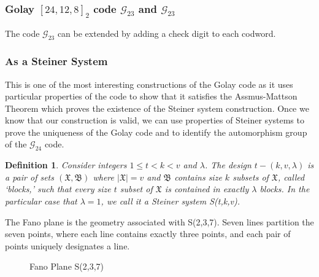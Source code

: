 \documentclass[paper=a4, fontsize=11pt]{scrartcl} %
\numberwithin{equation}{section} %
\numberwithin{figure}{section} %
\numberwithin{table}{section} %
\theoremstyle{break}
\newtheorem{defn}{Definition}
\begin{document}
\subsubsection{Golay $[24,12,8]_2$ code $\mathcal{G}_{23}$ and $\mathcal{G}_{23}$}
The code $\mathcal{G}_{23}$ can be extended by adding a check digit to each codword.

\subsubsection{As a Steiner System}
This is one of the most interesting constructions of the Golay code as it uses particular properties of the code to show that it satisfies the Assmus-Mattson Theorem which proves the existence of the Steiner system construction. Once we know that our construction is valid, we can use properties of Steiner systems to prove the uniqueness of the Golay code and to identify the automorphism group of the $\mathcal{G}_{24}$ code.

\begin{defn}
Consider integers $1 \leq t < k < v$ and $\lambda$. The design $t-(k,v,\lambda)$ is a pair of sets $(\mathfrak{X},\mathfrak{B})$ where $|\mathfrak{X}|=v$ and $\mathfrak{B}$ contains size $k$ subsets of $\mathfrak{X}$, called `blocks,' such that every size $t$ subset of $\mathfrak{X}$ is contained in exactly $\lambda$ blocks. In the particular case that $\lambda=1$, we call it a \textit{Steiner system} S(t,k,v).
\end{defn}

The Fano plane is the geometry associated with S(2,3,7). Seven lines partition the seven points, where each line contains exactly three points, and each pair of points uniquely designates a line.

\begin{figure}[hbp]
\centering
{}
\caption{Fano Plane S(2,3,7)} \label{fig:fplane}
\end{figure}
\end{document}
